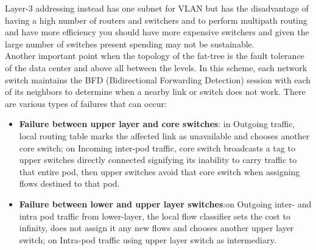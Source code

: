 \documentclass[]{article}
\begin{document}
Layer-3 addressing instead has one subnet for VLAN but has the disadvantage of having a high number of routers and switchers and to perform multipath routing and have more efficiency you should have more expensive switchers and given the large number of switches present spending may not be sustainable.\\
Another important point when the topology of the fat-tree is the fault tolerance of the data center and above all between the levels.
In this scheme, each network switch maintains the BFD (Bidirectional Forwarding Detection) session with each of its neighbors to determine when a nearby link or switch does not work.
There are various types of failures that can occur:
\begin{itemize}
	\item \textbf{Failure between upper layer and core switches}: in Outgoing traffic, local routing table marks the affected link as unavailable and chooses another core switch; on Incoming inter-pod traffic, core switch broadcasts a tag to upper switches directly connected signifying its inability to carry traffic to that entire pod, then upper switches avoid that core switch when assigning flows destined to that pod.
	\item \textbf{Failure between lower and upper layer switches}:on Outgoing inter- and intra pod traffic from lower-layer, the local flow classifier sets the cost to infinity, does not assign it any new flows and chooses another upper layer switch; on Intra-pod traffic using upper layer switch as intermediary.
\end{itemize}

 
\end{document}
